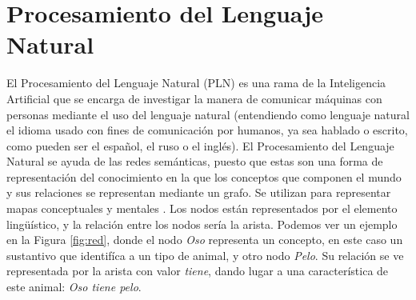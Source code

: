 \section{Procesamiento del Lenguaje Natural}
\label{cap:sec:lenguajenatural}
El Procesamiento del Lenguaje Natural (PLN) es una rama de la Inteligencia Artificial que se encarga de investigar la manera de comunicar máquinas con personas mediante el uso del lenguaje natural (entendiendo como lenguaje natural el idioma usado con fines de comunicación por humanos, ya sea hablado o escrito, como pueden ser el español, el ruso o el inglés). 
El Procesamiento del Lenguaje Natural se ayuda de las redes semánticas, puesto que estas son una forma de representación del conocimiento en la que los conceptos que componen el mundo y sus relaciones se representan mediante un grafo. Se utilizan para representar mapas conceptuales y mentales \citep{wiki:redSemantica2018}.
Los nodos están representados por el elemento lingüístico, y la relación entre los nodos sería la arista. Podemos ver un ejemplo en la Figura \ref{fig:red}, donde el nodo \textit{Oso} representa un concepto, en este caso un sustantivo que identifíca a un tipo de animal,  y otro nodo \textit{Pelo}. Su relación se ve representada por la arista con valor \textit{tiene}, dando lugar a una característica de este animal: \textit{Oso tiene pelo}.
 
